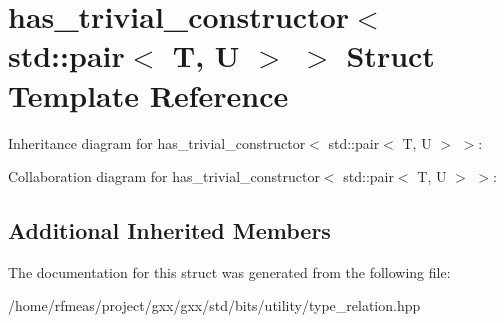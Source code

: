 \hypertarget{structhas__trivial__constructor_3_01std_1_1pair_3_01T_00_01U_01_4_01_4}{}\section{has\+\_\+trivial\+\_\+constructor$<$ std\+:\+:pair$<$ T, U $>$ $>$ Struct Template Reference}
\label{structhas__trivial__constructor_3_01std_1_1pair_3_01T_00_01U_01_4_01_4}


Inheritance diagram for has\+\_\+trivial\+\_\+constructor$<$ std\+:\+:pair$<$ T, U $>$ $>$\+:


Collaboration diagram for has\+\_\+trivial\+\_\+constructor$<$ std\+:\+:pair$<$ T, U $>$ $>$\+:
\subsection*{Additional Inherited Members}


The documentation for this struct was generated from the following file\+:\begin{DoxyCompactItemize}
\item 
/home/rfmeas/project/gxx/gxx/std/bits/utility/type\+\_\+relation.\+hpp\end{DoxyCompactItemize}
